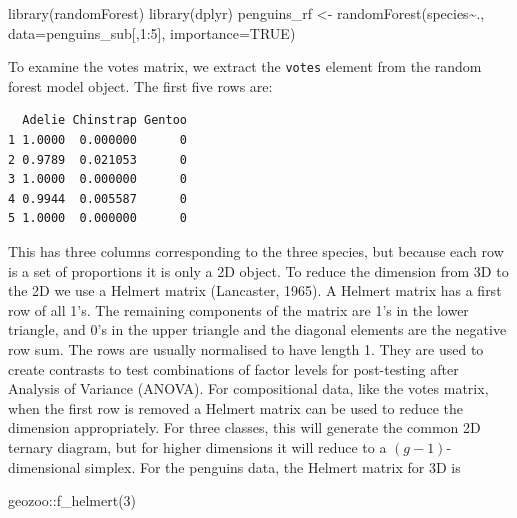 \documentclass[
  letterpaper,
]{krantz}
\newenvironment{Shaded}{\begin{snugshade}}{\end{snugshade}}
\newcommand{\AttributeTok}[1]{\textcolor[rgb]{0.40,0.45,0.13}{#1}}
\newcommand{\ConstantTok}[1]{\textcolor[rgb]{0.56,0.35,0.01}{#1}}
\newcommand{\DecValTok}[1]{\textcolor[rgb]{0.68,0.00,0.00}{#1}}
\newcommand{\FunctionTok}[1]{\textcolor[rgb]{0.28,0.35,0.67}{#1}}
\newcommand{\NormalTok}[1]{\textcolor[rgb]{0.00,0.23,0.31}{#1}}
\newcommand{\OtherTok}[1]{\textcolor[rgb]{0.00,0.23,0.31}{#1}}
\newcommand{\SpecialCharTok}[1]{\textcolor[rgb]{0.37,0.37,0.37}{#1}}
\begin{document}
\begin{Shaded}
\begin{Highlighting}[]
\FunctionTok{library}\NormalTok{(randomForest)}
\FunctionTok{library}\NormalTok{(dplyr)}
\NormalTok{penguins\_rf }\OtherTok{\textless{}{-}} \FunctionTok{randomForest}\NormalTok{(species}\SpecialCharTok{\textasciitilde{}}\NormalTok{.,}
                             \AttributeTok{data=}\NormalTok{penguins\_sub[,}\DecValTok{1}\SpecialCharTok{:}\DecValTok{5}\NormalTok{],}
                             \AttributeTok{importance=}\ConstantTok{TRUE}\NormalTok{)}
\end{Highlighting}
\end{Shaded}

To examine the votes matrix, we extract the \texttt{votes} element from
the random forest model object. The first five rows are:

\begin{Shaded}
\end{Shaded}

\begin{verbatim}
  Adelie Chinstrap Gentoo
1 1.0000  0.000000      0
2 0.9789  0.021053      0
3 1.0000  0.000000      0
4 0.9944  0.005587      0
5 1.0000  0.000000      0
\end{verbatim}

This has three columns corresponding to the three species, but because
each row is a set of proportions it is only a 2D object. To reduce the
dimension from 3D to the 2D we use a Helmert matrix (Lancaster, 1965). A
Helmert matrix has a first row of all 1's. The remaining components of
the matrix are 1's in the lower triangle, and 0's in the upper triangle
and the diagonal elements are the negative row sum. The rows are usually
normalised to have length 1. They are used to create contrasts to test
combinations of factor levels for post-testing after Analysis of
Variance (ANOVA). For compositional data, like the votes matrix, when
the first row is removed a Helmert matrix can be used to reduce the
dimension appropriately. For three classes, this will generate the
common 2D ternary diagram, but for higher dimensions it will reduce to a
\((g-1)\)-dimensional simplex. For the penguins data, the Helmert matrix
for 3D is 

\begin{Shaded}
\begin{Highlighting}[]
\NormalTok{geozoo}\SpecialCharTok{::}\FunctionTok{f\_helmert}\NormalTok{(}\DecValTok{3}\NormalTok{)}
\end{Highlighting}
\end{Shaded}
\end{document}
